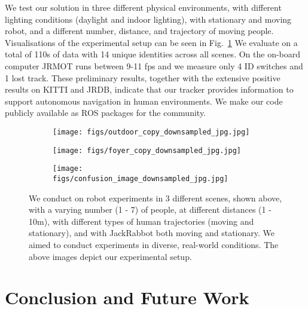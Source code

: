 \documentclass[letterpaper, 10 pt, conference]{ieeeconf}
\newcommand{\jrdb}{JRDB\xspace}
\newcommand{\jackrabbot}{JackRabbot\xspace}
\newcommand{\methodname}{{JRMOT}\xspace}
\begin{document}
We test our solution in three different physical environments, with different lighting conditions (daylight and indoor lighting), with stationary and moving robot, and a different number, distance, and trajectory of moving people. Visualisations of the experimental setup can be seen in Fig.~\ref{fig:exp_setup} We evaluate on a total of 110s of data with 14 unique identities across all scenes. On the on-board computer \methodname runs between 9-11 fps and we measure only 4 ID switches and 1 lost track. These preliminary results, together with the extensive positive results on KITTI and \jrdb, indicate that our tracker provides information to support autonomous navigation in human environments. We make our code publicly available as ROS packages for the community.
\begin{figure}[h]
\centering
\begin{subfigure}{0.15\textwidth}
\texttt{[image: figs/outdoor\_copy\_downsampled\_jpg.jpg]}
\end{subfigure}
\centering
\begin{subfigure}{0.15\textwidth}
\texttt{[image: figs/foyer\_copy\_downsampled\_jpg.jpg]}
\end{subfigure}
\begin{subfigure}{0.15\textwidth}
\centering
\texttt{[image: figs/confusion\_image\_downsampled\_jpg.jpg]}
\end{subfigure}
\caption{We conduct on robot experiments in 3 different scenes, shown above, with a varying number (1 - 7) of people, at different distances (1 - 10m), with different types of human trajectories (moving and stationary), and with \jackrabbot both moving and stationary. We aimed to conduct experiments in diverse, real-world conditions. The above images depict our experimental setup.}
\label{fig:exp_setup}
\end{figure}






%
 \vspace{-0.5cm}
\section{Conclusion and Future Work}
\label{s:conc}
\end{document}
